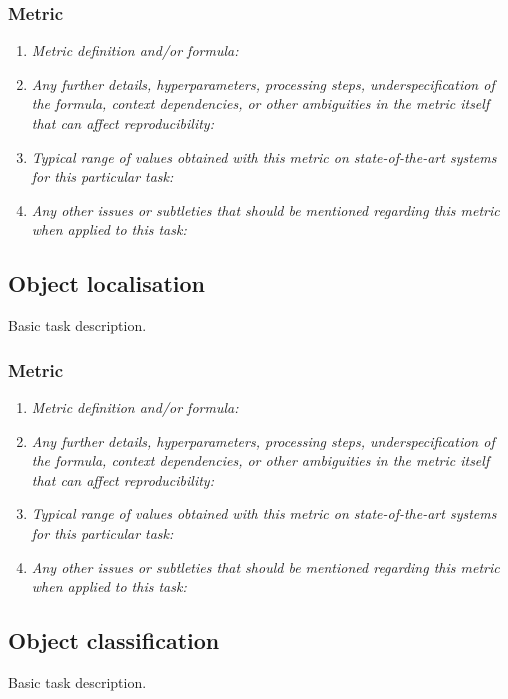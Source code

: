 \documentclass[a4paper,11pt]{article}
\begin{document}
    \subsubsection{Metric}
        \begin{enumerate}[label=\alph*.]
            \item \textit{Metric definition and/or formula:}
            \bigskip
            \item \textit{Any further details, hyperparameters, processing steps, underspecification of the formula, context dependencies, or other ambiguities in the metric itself that can affect reproducibility:}
            \bigskip
            \item \textit{Typical range of values obtained with this metric on state-of-the-art systems for this particular task:}
            \bigskip
            \item \textit{Any other issues or subtleties that should be mentioned regarding this metric when applied to this task:}
            \bigskip
        \end{enumerate}

\subsection{Object localisation}
    Basic task description. 
    \subsubsection{Metric}
        \begin{enumerate}[label=\alph*.]
            \item \textit{Metric definition and/or formula:}
            \bigskip
            \item \textit{Any further details, hyperparameters, processing steps, underspecification of the formula, context dependencies, or other ambiguities in the metric itself that can affect reproducibility:}
            \bigskip
            \item \textit{Typical range of values obtained with this metric on state-of-the-art systems for this particular task:}
            \bigskip
            \item \textit{Any other issues or subtleties that should be mentioned regarding this metric when applied to this task:}
            \bigskip
        \end{enumerate}

\subsection{Object classification}
    Basic task description.
\end{document}
